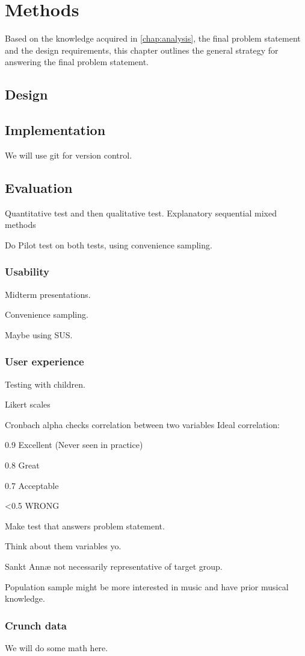 \chapter{Methods}
Based on the knowledge acquired in \autoref{chap:analysis}, the final problem statement and the design requirements, this chapter outlines the general strategy for answering the final problem statement.
\section{Design}
\section{Implementation}
We will use git for version control.
\section{Evaluation}
Quantitative test and then qualitative test.
Explanatory sequential mixed methods\cite[p.~21]{bjoernerBog}

Do Pilot test on both tests, using convenience sampling.
\subsection{Usability}
	Midterm presentations.
	
	Convenience sampling.
	
	Maybe using SUS.
\subsection{User experience}
Testing with children\cite[p.~207]{bjoernerBog}.

Likert scales

Cronbach alpha checks correlation between two variables
Ideal correlation:

0.9 Excellent (Never seen in practice)

0.8 Great

0.7 Acceptable

<0.5 WRONG

Make test that answers problem statement.

Think about them variables yo.

Sankt Annæ not necessarily representative of target group.

Population sample might be more interested in music and have prior musical knowledge.

\subsection{Crunch data}
	We will do some math here.